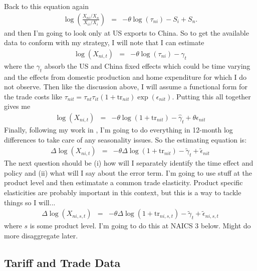 \documentclass[pdftex,12pt]{article}
\begin{document}
Back to this equation again
\begin{eqnarray}
\displaystyle \log\left(\frac{X_{ni}/X_n}{X_{ii}/X_i}\right)&=&-\theta \log\left(\tau_{ni}\right) -  S_i +  S_n.
\end{eqnarray}
and then I'm going to look only at US exports to China. So to get the available data to conform with my strategy, I will note that I can estimate
\begin{eqnarray}
\displaystyle \log\left(X_{ni,t}\right)&=&-\theta \log\left(\tau_{ni}\right) -  \gamma_{t}
\end{eqnarray}
where the $\gamma_{t}$ absorb the US and China fixed effects which could be time varying and the effects from domestic production and home expenditure for which I do not observe. Then like the discussion above, I will assume a functional form for the trade costs like $\tau_{nit} = \tau_{nt} \tau_{it} (1+ \mbox{tr}_{nit}) \exp(\epsilon_{nit})$. Putting this all together gives me
\begin{eqnarray}
\displaystyle \log\left(X_{ni,t}\right)&=& -\theta \log\left(1+ \mbox{tr}_{nit} \right) -  \hat \gamma_{t} + \theta \epsilon_{nit}
\end{eqnarray}
Finally, following my work in \citet{waugh_consumption}, I'm going to do everything in 12-month log differences to take care of any seasonality issues. So the estimating equation is:
\begin{eqnarray}
\displaystyle \Delta \log\left(X_{ni,t}\right)&=& -\theta \Delta \log\left(1+ \mbox{tr}_{nit} \right) -  \tilde \gamma_{t} + \tilde \epsilon_{nit}
\end{eqnarray}
The next question should be (i) how will I separately identify the time effect and policy and (ii) what will I say about the error term. I'm going to use stuff at the product level and then estimatate a common trade elasticity. Product specific elasticities are probably important in this context, but this is a way to tackle things so I will...
 \begin{eqnarray}
\displaystyle \Delta \log\left(X_{ni,s,t}\right)&=& -\theta \Delta \log\left(1+ \mbox{tr}_{ni,s,t} \right) -  \tilde \gamma_{t} + \tilde \epsilon_{ni,s,t}
\label{eq:trade_war}
\end{eqnarray}
where $s$ is some product level. I'm going to do this at NAICS 3 below. Might do more disaggregate later.

\subsection{Tariff and Trade Data}
\end{document}
